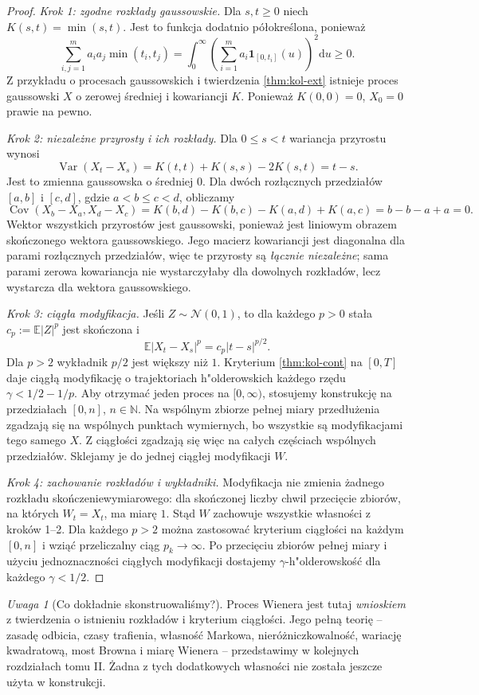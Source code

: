\documentclass[11pt,a4paper,oneside]{report}
\numberwithin{equation}{chapter}
\theoremstyle{plain}
\theoremstyle{definition}
\theoremstyle{remark}
\newtheorem{uwaga}{Uwaga}[chapter]
\newcommand{\N}{\mathbb{N}}
\newcommand{\E}{\mathbb{E}}
\newcommand{\Var}{\operatorname{Var}}
\newcommand{\Cov}{\operatorname{Cov}}
\newcommand{\ind}[1]{\mathbf{1}_{#1}}
\newcommand{\dd}{\mathrm{d}}
\newcommand{\Normal}{\mathcal{N}}
\begin{document}
\begin{proof}
\emph{Krok 1: zgodne rozkłady gaussowskie.}
Dla $s,t\ge0$ niech $K(s,t)=\min(s,t)$.
Jest to funkcja dodatnio półokreślona, ponieważ
\[
\sum_{i,j=1}^m a_ia_j\min(t_i,t_j)
=\int_0^\infty
\left(\sum_{i=1}^m a_i\ind{[0,t_i]}(u)\right)^2\dd u\ge0.
\]
Z przykładu o procesach gaussowskich i twierdzenia
\ref{thm:kol-ext} istnieje proces gaussowski $X$
o zerowej średniej i kowariancji $K$.
Ponieważ $K(0,0)=0$, $X_0=0$ prawie na pewno.

\emph{Krok 2: niezależne przyrosty i ich rozkłady.}
Dla $0\le s<t$ wariancja przyrostu wynosi
\[
\Var(X_t-X_s)=K(t,t)+K(s,s)-2K(s,t)=t-s.
\]
Jest to zmienna gaussowska o średniej $0$.
Dla dwóch rozłącznych przedziałów $[a,b]$ i $[c,d]$,
gdzie $a<b\le c<d$, obliczamy
\[
\Cov(X_b-X_a,X_d-X_c)
=K(b,d)-K(b,c)-K(a,d)+K(a,c)
=b-b-a+a=0.
\]
Wektor wszystkich przyrostów jest gaussowski, ponieważ
jest liniowym obrazem skończonego wektora gaussowskiego.
Jego macierz kowariancji jest diagonalna dla
parami rozłącznych przedziałów, więc te przyrosty są
\emph{łącznie niezależne}; sama parami zerowa kowariancja
nie wystarczyłaby dla dowolnych rozkładów, lecz wystarcza
dla wektora gaussowskiego.

\emph{Krok 3: ciągła modyfikacja.}
Jeśli $Z\sim\Normal(0,1)$, to dla każdego $p>0$
stała $c_p:=\E|Z|^p$ jest skończona i
\[
\E|X_t-X_s|^p=c_p|t-s|^{p/2}.
\]
Dla $p>2$ wykładnik $p/2$ jest większy niż $1$.
Kryterium \ref{thm:kol-cont} na $[0,T]$ daje
ciągłą modyfikację o trajektoriach h"olderowskich
każdego rzędu $\gamma<1/2-1/p$.
Aby otrzymać jeden proces na $[0,\infty)$, stosujemy
konstrukcję na przedziałach $[0,n]$, $n\in\N$.
Na wspólnym zbiorze pełnej miary przedłużenia
zgadzają się na wspólnych punktach wymiernych,
bo wszystkie są modyfikacjami tego samego $X$.
Z ciągłości zgadzają się więc na całych częściach wspólnych
przedziałów. Sklejamy je do jednej ciągłej modyfikacji $W$.

\emph{Krok 4: zachowanie rozkładów i wykładniki.}
Modyfikacja nie zmienia żadnego rozkładu
skończeniewymiarowego: dla skończonej liczby chwil
przecięcie zbiorów, na których $W_t=X_t$, ma miarę $1$.
Stąd $W$ zachowuje wszystkie własności z kroków 1--2.
Dla każdego $p>2$ można zastosować kryterium ciągłości
na każdym $[0,n]$ i wziąć przeliczalny ciąg
$p_k\to\infty$. Po przecięciu zbiorów pełnej miary
i użyciu jednoznaczności ciągłych modyfikacji dostajemy
$\gamma$-h"olderowskość dla każdego $\gamma<1/2$.
\end{proof}

\begin{uwaga}[Co dokładnie skonstruowaliśmy?]
Proces Wienera jest tutaj \emph{wnioskiem} z twierdzenia
o istnieniu rozkładów i kryterium ciągłości.
Jego pełną teorię -- zasadę odbicia, czasy trafienia,
własność Markowa, nieróżniczkowalność, wariację
kwadratową, most Browna i miarę Wienera --
przedstawimy w kolejnych rozdziałach tomu II.
Żadna z tych dodatkowych własności nie została
jeszcze użyta w konstrukcji.
\end{uwaga}
\end{document}
